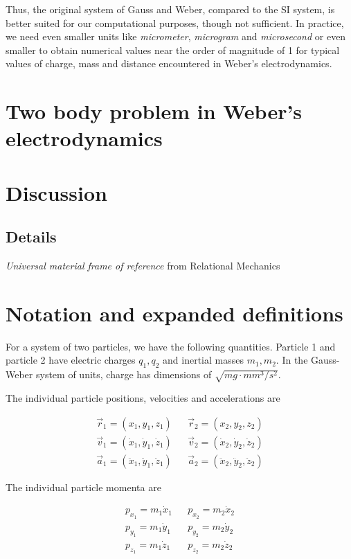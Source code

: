 \documentclass[12pt,a4paper]{article}
\theoremstyle{definition}
\theoremstyle{remark}
\begin{document}
Thus, the original system of Gauss and Weber, compared to the SI system, is better suited for our computational purposes, though not sufficient. In practice, we need even smaller units like \textit{micrometer}, \textit{microgram} and \textit{microsecond} or even smaller to obtain numerical values near the order of magnitude of 1 for typical values of charge, mass and distance encountered in Weber's electrodynamics.

\section{Two body problem in Weber's electrodynamics}

\section{Discussion}

\subsection{Details}\label{details}
\textit{Universal material frame of reference} from Relational Mechanics \citep{assis-relational-mechanics}

\appendix

\section{Notation and expanded definitions}\label{app:notation}
For a system of two particles, we have the following quantities. Particle 1 and particle 2 have electric charges $q_1, q_2$ and inertial masses $m_1, m_2$. In the Gauss-Weber system of units, charge has dimensions of $\sqrt{mg \cdot mm^3 / s^2}$.

The individual particle positions, velocities and accelerations are

\begin{align*}
    \vec{r}_1 = (x_1, y_1, z_1)                      &  & \vec{r}_2 = (x_2, y_2, z_2)                      \\
    \vec{v}_1 = (\dot{x}_1, \dot{y}_1, \dot{z}_1)    &  & \vec{v}_2 = (\dot{x}_2, \dot{y}_2, \dot{z}_2)    \\
    \vec{a}_1 = (\ddot{x}_1, \ddot{y}_1, \ddot{z}_1) &  & \vec{a}_2 = (\ddot{x}_2, \ddot{y}_2, \ddot{z}_2)
\end{align*}

The individual particle momenta are

\begin{align*}
    p_{x_1} = m_1 \dot{x}_1 &  & p_{x_2} = m_2 \dot{x}_2 \\
    p_{y_1} = m_1 \dot{y}_1 &  & p_{y_2} = m_2 \dot{y}_2 \\
    p_{z_1} = m_1 \dot{z}_1 &  & p_{z_2} = m_2 \dot{z}_2
\end{align*}
\end{document}
